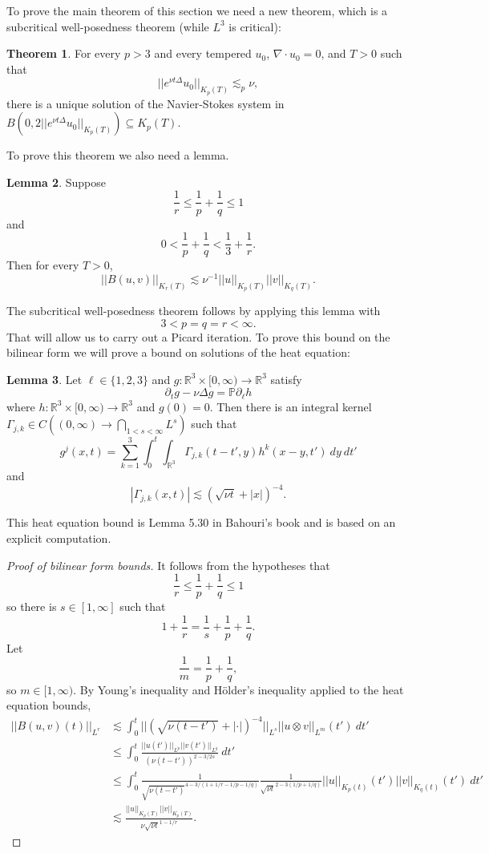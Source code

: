 \documentclass[12pt]{book}
\newcommand{\RR}{\mathbb{R}}
\newcommand{\PP}{\mathbb{P}}
\theoremstyle{definition}
\newtheorem{theorem}{Theorem}[chapter]
\newtheorem{lemma}[theorem]{Lemma}
\begin{document}
To prove the main theorem of this section we need a new theorem, which is a subcritical well-posedness theorem (while $L^3$ is critical):

\begin{theorem}
For every $p > 3$ and every tempered $u_0$, $\nabla \cdot u_0 = 0$, and $T > 0$ such that
$$||e^{\nu t \Delta} u_0||_{K_p(T)} \lesssim_p \nu,$$
there is a unique solution of the Navier-Stokes system in $B(0, 2||e^{\nu t\Delta}u_0||_{K_p(T)}) \subseteq K_p(T)$.
\end{theorem}

To prove this theorem we also need a lemma.

\begin{lemma}
Suppose
$$\frac{1}{r} \leq \frac{1}{p} + \frac{1}{q} \leq 1$$
and
$$0 < \frac{1}{p} + \frac{1}{q} < \frac{1}{3} + \frac{1}{r}.$$
Then for every $T > 0$,
$$||B(u, v)||_{K_r(T)} \lesssim \nu^{-1} ||u||_{K_p(T)} ||v||_{K_q(T)}.$$
\end{lemma}

The subcritical well-posedness theorem follows by applying this lemma with
$$3 < p = q = r < \infty.$$
That will allow us to carry out a Picard iteration.
To prove this bound on the bilinear form we will prove a bound on solutions of the heat equation:

\begin{lemma}
Let $\ell \in \{1, 2, 3\}$ and $g: \RR^3 \times [0, \infty) \to \RR^3$ satisfy
$$\partial_t g - \nu \Delta g = \PP \partial_\ell h$$
where $h: \RR^3 \times [0, \infty) \to \RR^3$ and $g(0) = 0$. Then there is an integral kernel $\Gamma_{j,k} \in C((0, \infty) \to \bigcap_{1 < s < \infty} L^s)$ such that
$$g^j(x, t) = \sum_{k=1}^3 \int_0^t \int_{\RR^3} \Gamma_{j,k}(t - t', y) h^k(x - y, t') ~dy ~dt'$$
and
$$|\Gamma_{j,k}(x, t)| \lesssim (\sqrt{\nu t} + |x|)^{-4}.$$
\end{lemma}

This heat equation bound is Lemma 5.30 in Bahouri's book and is based on an explicit computation.

\begin{proof}[Proof of bilinear form bounds]
It follows from the hypotheses that
$$\frac{1}{r} \leq \frac{1}{p} + \frac{1}{q} \leq 1$$
so there is $s \in [1, \infty]$ such that
$$1 + \frac{1}{r} = \frac{1}{s} + \frac{1}{p} + \frac{1}{q}.$$
Let
$$\frac{1}{m} = \frac{1}{p} + \frac{1}{q},$$
so $m \in [1, \infty)$.
By Young's inequality and H\"older's inequality applied to the heat equation bounds,
\begin{align*}||B(u, v)(t)||_{L^r} &\lesssim \int_0^t ||(\sqrt{\nu (t - t')} + |\cdot|)^{-4}||_{L^s} ||u \otimes v||_{L^m}(t') ~dt'\\
&\leq \int_0^t \frac{||u(t')||_{L^p} ||v(t')||_{L^q}}{(\nu(t - t'))^{2 - 3/2s}}~dt'\\
&\leq \int_0^t \frac{1}{\sqrt{\nu(t - t')}^{4-3/(1 + 1/r - 1/p - 1/q)}} \frac{1}{\sqrt{\nu t}^{2-3(1/p+1/q)}} ||u||_{K_p(t)}(t') ||v||_{K_q(t)}(t') ~dt'\\
&\lesssim \frac{||u||_{K_p(T)} ||v||_{K_p(T)}}{\nu\sqrt{\nu t}^{1-1/r}}.
\end{align*}
\end{proof}
\end{document}
